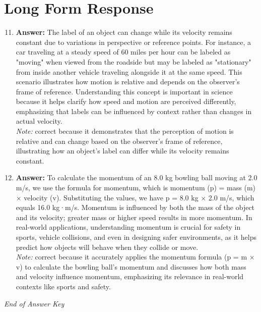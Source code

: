 \documentclass[12pt]{article}
\begin{document}
\section*{Long Form Response}
\begin{enumerate}[label=\arabic*.]
\setcounter{enumi}{10}
\item \textbf{Answer:} The label of an object can change while its velocity remains constant due to variations in perspective or reference points. For instance, a car traveling at a steady speed of 60 miles per hour can be labeled as "moving" when viewed from the roadside but may be labeled as "stationary" from inside another vehicle traveling alongside it at the same speed. This scenario illustrates how motion is relative and depends on the observer's frame of reference. Understanding this concept is important in science because it helps clarify how speed and motion are perceived differently, emphasizing that labels can be influenced by context rather than changes in actual velocity.
\\ \textit{Note:} correct because it demonstrates that the perception of motion is relative and can change based on the observer's frame of reference, illustrating how an object's label can differ while its velocity remains constant.
\item \textbf{Answer:} To calculate the momentum of an 8.0 kg bowling ball moving at 2.0 m/s, we use the formula for momentum, which is momentum (p) = mass (m) \ensuremath{\times} velocity (v). Substituting the values, we have p = 8.0 kg \ensuremath{\times} 2.0 m/s, which equals 16.0 kg·m/s. Momentum is influenced by both the mass of the object and its velocity; greater mass or higher speed results in more momentum. In real-world applications, understanding momentum is crucial for safety in sports, vehicle collisions, and even in designing safer environments, as it helps predict how objects will behave when they collide or move.
\\ \textit{Note:} correct because it accurately applies the momentum formula (p = m × v) to calculate the bowling ball's momentum and discusses how both mass and velocity influence momentum, emphasizing its relevance in real-world contexts like sports and safety.
\end{enumerate}

\vfill
\noindent\textit{End of Answer Key}
\end{document}
